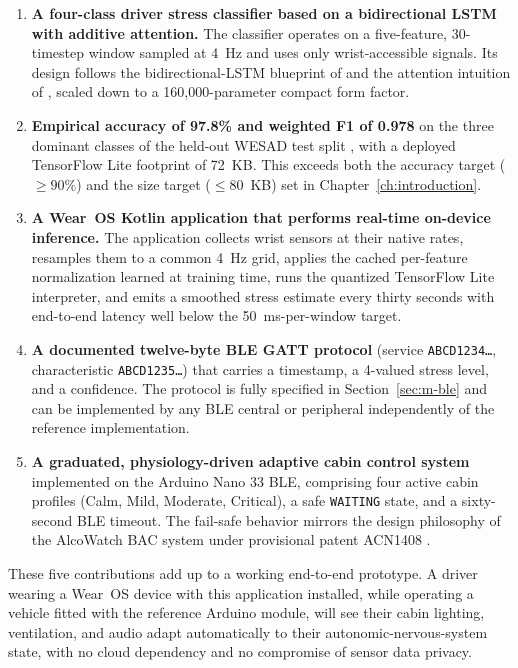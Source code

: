 \begin{enumerate}
  \item \textbf{A four-class driver stress classifier based on a
  bidirectional LSTM with additive attention.} The classifier
  operates on a five-feature, 30-timestep window sampled at 4~Hz
  and uses only wrist-accessible signals. Its design follows the
  bidirectional-LSTM blueprint of \citet{graves2005bilstm} and the
  attention intuition of \citet{vaswani2017attention}, scaled down
  to a 160{,}000-parameter compact form factor.

  \item \textbf{Empirical accuracy of 97.8\% and weighted F1 of 0.978}
  on the three dominant classes of the held-out WESAD test split
  \citep{schmidt2018wesad}, with a deployed TensorFlow Lite
  \citep{tflite2023} footprint of 72~KB. This exceeds both the accuracy
  target ($\ge 90\%$) and the size target ($\le 80$~KB) set in
  Chapter~\ref{ch:introduction}.

  \item \textbf{A Wear~OS Kotlin application that performs real-time
  on-device inference.} The application collects wrist sensors at
  their native rates, resamples them to a common 4~Hz grid, applies
  the cached per-feature normalization learned at training time,
  runs the quantized TensorFlow Lite interpreter, and emits a
  smoothed stress estimate every thirty seconds with end-to-end
  latency well below the 50~ms-per-window target.

  \item \textbf{A documented twelve-byte BLE GATT protocol}
  (service \texttt{ABCD1234\ldots}, characteristic
  \texttt{ABCD1235\ldots}) that carries a timestamp, a 4-valued
  stress level, and a confidence. The protocol is fully specified
  in Section~\ref{sec:m-ble} and can be implemented by any BLE
  central or peripheral independently of the reference
  implementation.

  \item \textbf{A graduated, physiology-driven adaptive cabin
  control system} implemented on the Arduino Nano 33 BLE, comprising
  four active cabin profiles (Calm, Mild, Moderate, Critical), a
  safe \texttt{WAITING} state, and a sixty-second BLE timeout.
  The fail-safe behavior mirrors the design philosophy of the
  AlcoWatch BAC system under provisional patent ACN1408
  \citep{acn1408}.
\end{enumerate}

These five contributions add up to a working end-to-end prototype.
A driver wearing a Wear~OS device with this application installed,
while operating a vehicle fitted with the reference Arduino module,
will see their cabin lighting, ventilation, and audio adapt
automatically to their autonomic-nervous-system state, with no cloud
dependency and no compromise of sensor data privacy.

